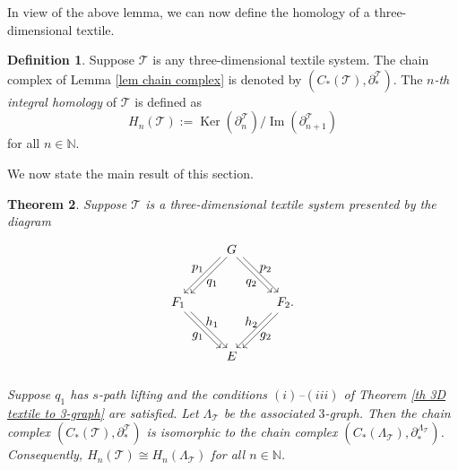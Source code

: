 \documentclass[a4paper,reqno,12pt]{amsart}
\newtheorem{thm}{Theorem}[section]
\theoremstyle{definition}
\newtheorem{dfn}[thm]{Definition}
\theoremstyle{remark}
\newcommand{\image}{\operatorname{Im}}
\newcommand{\Ker}{\operatorname{Ker}}
\def\mT{\mathcal{T}}
\begin{document}
In view of the above lemma, we can now define the homology of a three-dimensional textile. 
\begin{dfn}\label{def homology of 3D textile}
Suppose $\mT$ is any three-dimensional textile system. The chain complex of Lemma \ref{lem chain complex} is denoted by $(C_*(\mT),\partial_*^\mT)$. The \emph{$n$-th integral homology} of $\mT$ is defined as \[H_n(\mT):=\Ker(\partial_n^\mT)/\image(\partial_{n+1}^\mT)\] for all $n\in \mathbb{N}$. 
\end{dfn}
We now state the main result of this section. 
\begin{thm}\label{th the homologies are isomorphic}
Suppose $\mathcal{T}$ is a three-dimensional textile system presented by the diagram 
\[
\begin{tikzpicture}[scale=1]
\node[inner sep=2.5pt, circle] (B) at (-1.5,0) {$F_1$};
\node[inner sep=2.5pt, circle] (C) at (1.5,0) {$F_2$.};	
\node[inner sep=2.5pt, circle] (D) at (0,-1.5) {$E$};
\node[inner sep=2.5pt, circle] (A) at (0,1.5) {$G$}; 

\draw[transform canvas={xshift=0.6ex}, ->] (A) -- (B);
\draw[transform canvas={xshift=-0.6ex}, ->] (A) -- (B);

\draw[transform canvas={xshift=0.6ex}, ->] (A) -- (C);
\draw[transform canvas={xshift=-0.6ex}, ->] (A) -- (C);

\draw[transform canvas={xshift=0.6ex}, ->] (C) -- (D);
\draw[transform canvas={xshift=-0.6ex}, ->] (C) -- (D);

\draw[transform canvas={xshift=0.6ex}, ->] (B) -- (D);
\draw[transform canvas={xshift=-0.6ex}, ->] (B) -- (D);

\node at (-0.55,0.55) {$q_1$};
\node at (-0.95,0.95) {$p_1$};

\node at (0.55,0.55) {$q_2$};
\node at (0.95,0.95) {$p_2$};

\node at (-0.55,-0.55) {$h_1$};
\node at (-0.95,-0.95) {$g_1$};

\node at (0.55,-0.55) {$h_2$};
\node at (0.95,-0.95) {$g_2$};
\end{tikzpicture}
\]

Suppose $q_1$ has $s$-path lifting and the conditions $(i)$--$(iii)$ of Theorem \ref{th 3D textile to 3-graph} are satisfied. Let $\Lambda_\mT$ be the associated $3$-graph. Then the chain complex $(C_*(\mT),\partial_*^\mT)$ is isomorphic to the chain complex $(C_*(\Lambda_\mT),\partial_*^{\Lambda_\mT})$. Consequently, $H_n(\mT)\cong H_n(\Lambda_\mT)$ for all $n\in \mathbb{N}$.
\end{thm}
\end{document}
